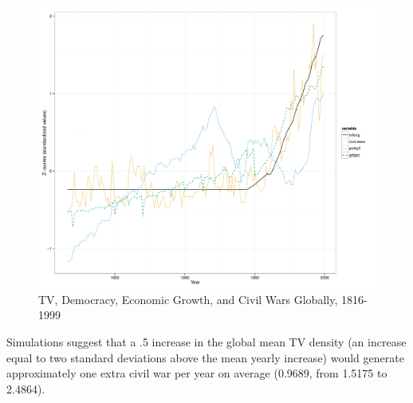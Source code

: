 \documentclass[11pt,article,oneside]{memoir}
\makeatletter
\def\maxwidth{\ifdim\Gin@nat@width>\linewidth\linewidth
\else\Gin@nat@width\fi}
\let\Oldincludegraphics\includegraphics
\renewcommand{\includegraphics}[1]{\Oldincludegraphics[width=\maxwidth]{#1}}
\makeatother
\begin{document}
\begin{figure}[htbp]
\centering
\includegraphics{media_civil_war_files/figure-markdown/longrunplot.pdf}
\caption{TV, Democracy, Economic Growth, and Civil Wars Globally,
1816-1999}
\end{figure}

Simulations suggest that a .5 increase in the global mean TV density (an
increase equal to two standard deviations above the mean yearly
increase) would generate approximately one extra civil war per year on
average (0.9689, from 1.5175 to 2.4864).
\end{document}

